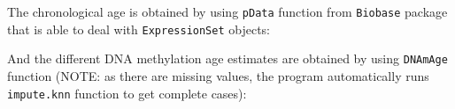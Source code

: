 \documentclass[]{article}
\newcommand{\hlstr}[1]{\textcolor[rgb]{0.251,0.627,0.251}{#1}}%
\newcommand{\hlopt}[1]{\textcolor[rgb]{0,0,0}{#1}}%
\newcommand{\hlstd}[1]{\textcolor[rgb]{0.251,0.251,0.251}{#1}}%
\newcommand{\hlkwc}[1]{\textcolor[rgb]{0.251,0.251,0.251}{#1}}%
\newcommand{\hlkwd}[1]{\textcolor[rgb]{0.878,0.439,0.125}{#1}}%
\newenvironment{Shaded}{\begin{myshaded}}{\end{myshaded}}
\newcommand{\KeywordTok}[1]{\hlkwd{#1}}
\newcommand{\DataTypeTok}[1]{\hlkwc{#1}}
\newcommand{\StringTok}[1]{\hlstr{#1}}
\newcommand{\OperatorTok}[1]{\hlopt{#1}}
\newcommand{\NormalTok}[1]{\hlstd{#1}}
\begin{document}
The chronological age is obtained by using \texttt{pData} function from \texttt{Biobase} package that is able to deal with \texttt{ExpressionSet} objects:

\begin{Shaded}
\end{Shaded}

And the different DNA methylation age estimates are obtained by using \texttt{DNAmAge} function (NOTE: as there are missing values, the program automatically runs \texttt{impute.knn} function to get complete cases):
\end{document}
